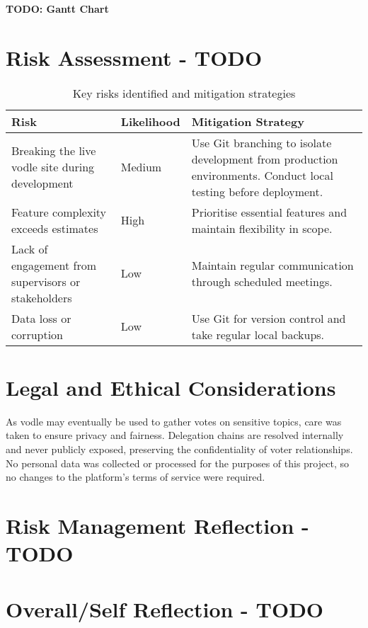 \textbf{TODO: Gantt Chart}
\section{Risk Assessment - TODO}
\begin{table}[h!]
\centering
\begin{tabular}{|p{4.5cm}|p{2cm}|p{8cm}|}
\hline
\textbf{Risk} & \textbf{Likelihood} & \textbf{Mitigation Strategy} \\
\hline
Breaking the live vodle site during development & Medium & Use Git branching to isolate development from production environments. Conduct local testing before deployment. \\
\hline
Feature complexity exceeds estimates & High & Prioritise essential features and maintain flexibility in scope. \\
\hline
Lack of engagement from supervisors or stakeholders & Low & Maintain regular communication through scheduled meetings. \\
\hline
Data loss or corruption & Low & Use Git for version control and take regular local backups. \\
\hline
\end{tabular}
\caption{Key risks identified and mitigation strategies}
\label{tab:risk-assessment}
\end{table}

\section{Legal and Ethical Considerations}

As vodle may eventually be used to gather votes on sensitive topics, care was taken to ensure privacy and fairness. Delegation chains are resolved internally and never publicly exposed, preserving the confidentiality of voter relationships. No personal data was collected or processed for the purposes of this project, so no changes to the platform's terms of service were required.

\section{Risk Management Reflection - TODO}

\section{Overall/Self Reflection - TODO}


